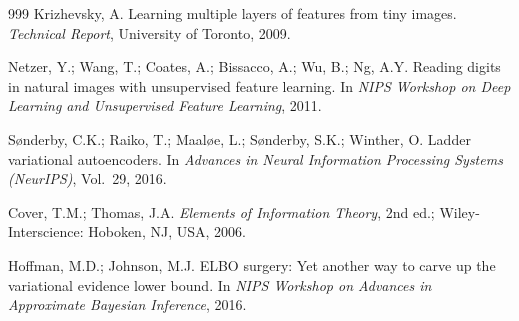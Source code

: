 \documentclass[make,article,submit,pdftex,moreauthors]{Definitions/mdpi}
\begin{document}
\begin{thebibliography}{999}
Krizhevsky, A.
Learning multiple layers of features from tiny images.
\textit{Technical Report}, University of Toronto, 2009.

Netzer, Y.; Wang, T.; Coates, A.; Bissacco, A.; Wu, B.; Ng, A.Y.
Reading digits in natural images with unsupervised feature learning.
In \textit{NIPS Workshop on Deep Learning and Unsupervised Feature Learning},
2011.

S{\o}nderby, C.K.; Raiko, T.; Maal{\o}e, L.; S{\o}nderby, S.K.; Winther, O.
Ladder variational autoencoders.
In \textit{Advances in Neural Information Processing Systems (NeurIPS)},
Vol.~29, 2016.

Cover, T.M.; Thomas, J.A.
\textit{Elements of Information Theory}, 2nd ed.;
Wiley-Interscience: Hoboken, NJ, USA, 2006.

Hoffman, M.D.; Johnson, M.J.
{ELBO} surgery: Yet another way to carve up the variational evidence lower
bound.
In \textit{NIPS Workshop on Advances in Approximate Bayesian Inference},
2016.

\end{thebibliography}
\end{document}
